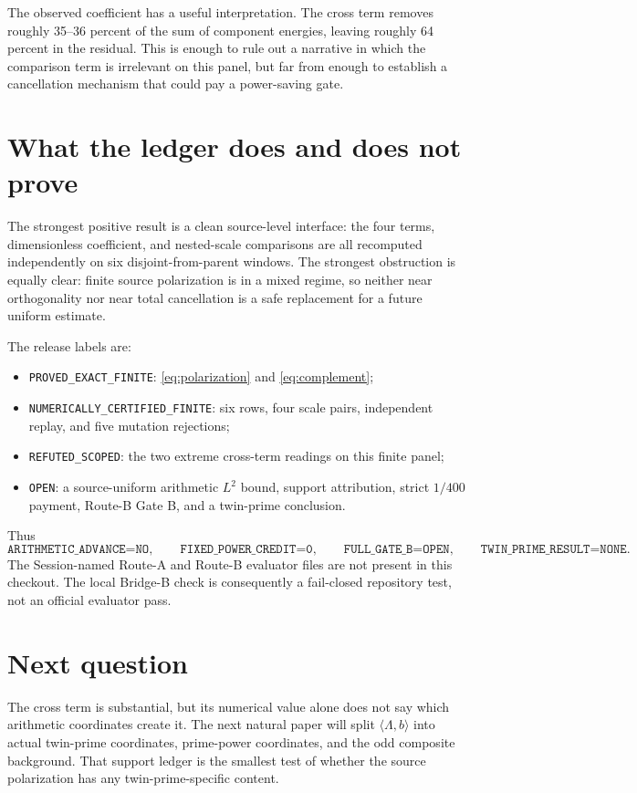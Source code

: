 \documentclass[10pt]{article}
\begin{document}
The observed coefficient has a useful interpretation.  The cross term
removes roughly 35--36 percent of the sum of component energies, leaving
roughly 64 percent in the residual.  This is enough to rule out a narrative
in which the comparison term is irrelevant on this panel, but far from enough
to establish a cancellation mechanism that could pay a power-saving gate.

\section{What the ledger does and does not prove}

The strongest positive result is a clean source-level interface: the four
terms, dimensionless coefficient, and nested-scale comparisons are all
recomputed independently on six disjoint-from-parent windows.  The strongest
obstruction is equally clear: finite source polarization is in a mixed
regime, so neither near orthogonality nor near total cancellation is a safe
replacement for a future uniform estimate.

The release labels are:
\begin{itemize}
\item \texttt{PROVED\_EXACT\_FINITE}: \eqref{eq:polarization} and
      \eqref{eq:complement};
\item \texttt{NUMERICALLY\_CERTIFIED\_FINITE}: six rows, four scale pairs,
      independent replay, and five mutation rejections;
\item \texttt{REFUTED\_SCOPED}: the two extreme cross-term readings on this
      finite panel;
\item \texttt{OPEN}: a source-uniform arithmetic $L^2$ bound, support
      attribution, strict $1/400$ payment, Route-B Gate B, and a twin-prime
      conclusion.
\end{itemize}
Thus
\[
 \texttt{ARITHMETIC\_ADVANCE=NO},\qquad
 \texttt{FIXED\_POWER\_CREDIT=0},\qquad
 \texttt{FULL\_GATE\_B=OPEN},\qquad
 \texttt{TWIN\_PRIME\_RESULT=NONE}.
\]
The Session-named Route-A and Route-B evaluator files are not present in this
checkout.  The local Bridge-B check is consequently a fail-closed repository
test, not an official evaluator pass.

\section{Next question}

The cross term is substantial, but its numerical value alone does not say
which arithmetic coordinates create it.  The next natural paper will split
$\langle\Lambda,b\rangle$ into actual twin-prime coordinates, prime-power
coordinates, and the odd composite background.  That support ledger is the
smallest test of whether the source polarization has any twin-prime-specific
content.



\end{document}
